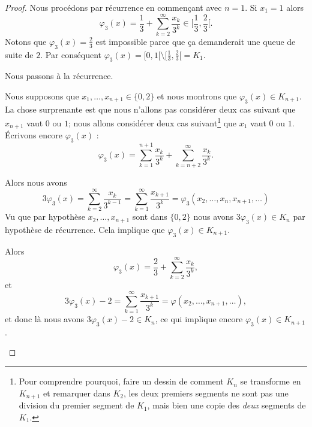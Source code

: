 \begin{proof}
    Nous procédons par récurrence en commençant avec \( n=1\). Si \( x_1=1\) alors
    \begin{equation}
        \varphi_3(x)=\frac{1}{ 3 }+\sum_{k=2}^{\infty}\frac{ x_k }{ 3^k }\in\mathopen[ \frac{1}{ 3 } , \frac{ 2 }{ 3 } [.
    \end{equation}
    Notons que \( \varphi_3(x)=\frac{ 2 }{ 3 }\) est impossible parce que ça demanderait une queue de suite de \( 2\). Par conséquent \( \varphi_3(x)=\mathopen[ 0 , 1 [\setminus\mathopen[ \frac{1}{ 3 } , \frac{ 2 }{ 3 } [=K_1\).

        Nous passons à la récurrence. 
        
        \begin{subproof}
        \item[Sens direct]
        
        Nous supposons que \( x_1,\ldots, x_{n+1}\in\{ 0,2 \}\) et nous montrons que \( \varphi_3(x)\in K_{n+1}\). La chose surprenante est que nous n'allons pas considérer deux cas suivant que \( x_{n+1}\) vaut \( 0\) ou \( 1\); nous allons considérer deux cas suivant\footnote{Pour comprendre pourquoi, faire un dessin de comment \( K_n\) se transforme en \( K_{n+1}\) et remarquer dans \( K_2\), les deux premiers segments ne sont pas une division du premier segment de \( K_1\), mais bien une copie des \emph{deux} segments de \( K_1\).} que \( x_1\) vaut \( 0\) ou \( 1\). Écrivons encore \( \varphi_3(x)\) :
    \begin{equation}
        \varphi_3(x)=\sum_{k=1}^{n+1}\frac{ x_k }{ 3^k }+\sum_{k=n+2}^{\infty}\frac{ x_k }{ 3^k }.
    \end{equation}
    \begin{subproof}
        \item[Si \( x_1=0\)]
            Alors nous avons
            \begin{equation}
                3\varphi_3(x)=\sum_{k=2}^{\infty}\frac{ x_k }{ 3^{k-1} }=\sum_{k=1}^{\infty}\frac{ x_{k+1} }{ 3^k }=\varphi_3(x_2,\ldots, x_n,x_{n+1},\ldots)
            \end{equation}
            Vu que par hypothèse \( x_2,\ldots, x_{n+1}\) sont dans \( \{ 0,2 \}\) nous avons \( 3\varphi_3(x)\in K_n\) par hypothèse de récurrence. Cela implique que \( \varphi_3(x)\in K_{n+1}\).
        \item[Si \( x_1=2\)]
            Alors
            \begin{equation}
                \varphi_3(x)=\frac{ 2 }{ 3 }+\sum_{k=2}^{\infty}\frac{ x_k }{ 3^k },
            \end{equation}
            et
            \begin{equation}
                3\varphi_3(x)-2=\sum_{k=1}^{\infty}\frac{ x_{k+1} }{ 3^k }=\varphi(x_2,\ldots, x_{n+1},\ldots),
            \end{equation}
            et donc là nous avons \( 3\varphi_3(x)-2\in K_n\), ce qui implique encore \( \varphi_3(x)\in K_{n+1}\).
    \end{subproof}
    

\end{subproof}
\end{proof}
